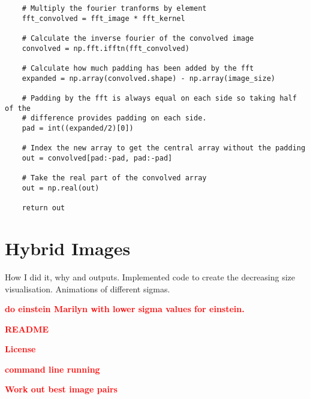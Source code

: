 \documentclass[a4paper,10pt]{article}
\newcommand{\todo}[1] {\textbf{\textcolor{red}{#1}}}
\begin{document}
\begin{lstlisting}
    # Multiply the fourier tranforms by element
    fft_convolved = fft_image * fft_kernel

    # Calculate the inverse fourier of the convolved image
    convolved = np.fft.ifftn(fft_convolved)

    # Calculate how much padding has been added by the fft
    expanded = np.array(convolved.shape) - np.array(image_size)

    # Padding by the fft is always equal on each side so taking half of the
    # difference provides padding on each side.
    pad = int((expanded/2)[0])

    # Index the new array to get the central array without the padding
    out = convolved[pad:-pad, pad:-pad]

    # Take the real part of the convolved array
    out = np.real(out)

    return out
\end{lstlisting}

\section{Hybrid Images}
How I did it, why and outputs. Implemented code to create the decreasing size
visualisation. Animations of different sigmas.

\todo{do einstein Marilyn with lower sigma values for einstein.}

\todo{README}

\todo{License}

\todo{command line running}

\todo{Work out best image pairs}
\end{document}
